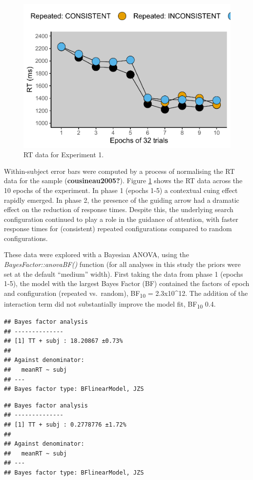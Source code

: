 \documentclass[
  man]{apa7}
\begin{document}
\begin{figure}

{\centering \includegraphics[width=0.6\linewidth]{CCC_ms1_files/figure-latex/Exp1-RT-figure-1} 

}

\caption{RT data for Experiment 1.}\label{fig:Exp1-RT-figure}
\end{figure}

Within-subject error bars were computed by a process of normalising the RT data for the sample (\textbf{cousineau2005?}). Figure \ref{fig:Exp1-RT-figure} shows the RT data across the 10 epochs of the experiment. In phase 1 (epochs 1-5) a contextual cuing effect rapidly emerged. In phase 2, the presence of the guiding arrow had a dramatic effect on the reduction of response times. Despite this, the underlying search configuration continued to play a role in the guidance of attention, with faster response times for (consistent) repeated configurations compared to random configurations.



These data were explored with a Bayesian ANOVA, using the \emph{BayesFactor::anovaBF()} function (for all analyses in this study the priors were set at the default ``medium'' width). First taking the data from phase 1 (epochs 1-5), the model with the largest Bayes Factor (BF) contained the factors of epoch and configuration (repeated vs.~random), BF\textsubscript{10} = 2.3x10\^{}12. The addition of the interaction term did not substantially improve the model fit, BF\textsubscript{10} 0.4.

\begin{verbatim}
## Bayes factor analysis
## --------------
## [1] TT + subj : 18.20867 ±0.73%
## 
## Against denominator:
##   meanRT ~ subj 
## ---
## Bayes factor type: BFlinearModel, JZS
\end{verbatim}

\begin{verbatim}
## Bayes factor analysis
## --------------
## [1] TT + subj : 0.2778776 ±1.72%
## 
## Against denominator:
##   meanRT ~ subj 
## ---
## Bayes factor type: BFlinearModel, JZS
\end{verbatim}
\end{document}
